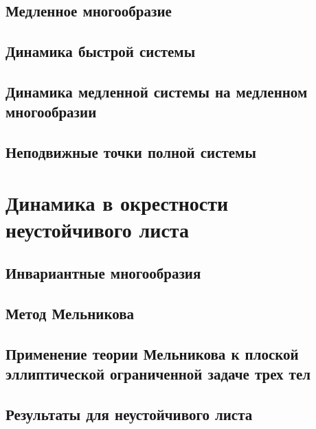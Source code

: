 \documentclass[a4paper, 12pt]{article}
\begin{document}
        \subsection{Медленное многообразие}
        

        \subsection{Динамика быстрой системы}
        

        \subsection{Динамика медленной системы на медленном многообразии}
        

        \subsection{Неподвижные точки полной системы}
        
       
        
    \section{Динамика в окрестности неустойчивого листа}
        \subsection{Инвариантные многообразия}
        


        \subsection{Метод Мельникова}
        

        \subsection{Применение теории Мельникова к плоской эллиптической ограниченной задаче трех тел}
        

        \subsection{Результаты для неустойчивого листа}
        
    
\end{document}
